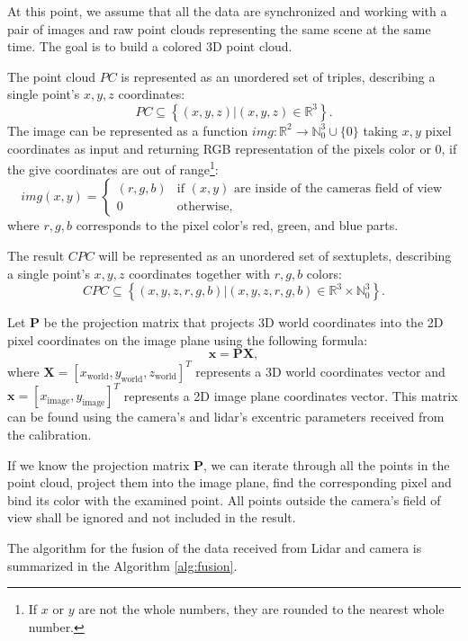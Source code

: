 At this point, we assume that all the data are synchronized and working with a pair of images and raw point clouds representing the same scene at the same time. The goal is to build a colored 3D point cloud.\par
The point cloud $PC$ is represented as an unordered set of triples, describing a single point's $x, y, z$ coordinates:
$$
    PC \subseteq \left\{ (x,y,z) | (x,y,z) \in \mathbb{R}^3\right\}.
$$
The image can be represented as a function $img: \mathbb{R}^2 \rightarrow \mathbb{N}_0^3 \cup \{0\}$ taking $x,y$ pixel coordinates as input and returning RGB representation of the pixels color or 0, if the give coordinates are out of range\footnote{If $x$ or $y$ are not the whole numbers, they are rounded to the nearest whole number.}:
$$
    img(x,y) = \begin{cases}
        (r,g,b) & \text{if $(x,y)$ are inside of the cameras field of view} \\
        0       & \text{otherwise,}
    \end{cases}
$$
where $r,g,b$ corresponds to the pixel color's red, green, and blue parts.\par
The result $CPC$ will be represented as an unordered set of sextuplets, describing a single point's $x, y, z$ coordinates together with $r, g, b$ colors:
$$
    CPC \subseteq \left\{ (x,y,z,r,g,b) | (x,y,z,r,g,b) \in \mathbb{R}^3 \times \mathbb{N}_0^3 \right\}.
$$\par
Let $\mathbf{P}$ be the projection matrix that projects 3D world coordinates into the 2D pixel coordinates on the image plane using the following formula:
$$
    \mathbf{x} = \mathbf{P}\mathbf{X},
$$
where $\mathbf{X} = \left[x_\text{world},y_\text{world},z_\text{world}\right]^T$ represents a 3D world coordinates vector and $\mathbf{x} = \left[x_\text{image}, y_\text{image}\right]^T$ represents a 2D image plane coordinates vector. This matrix can be found using the camera's and lidar's excentric parameters received from the calibration.\par
If we know the projection matrix $\mathbf{P}$, we can iterate through all the points in the point cloud, project them into the image plane, find the corresponding pixel and bind its color with the examined point. All points outside the camera's field of view shall be ignored and not included in the result.\par
The algorithm for the fusion of the data received from Lidar and camera is summarized in the Algorithm \ref{alg:fusion}.

